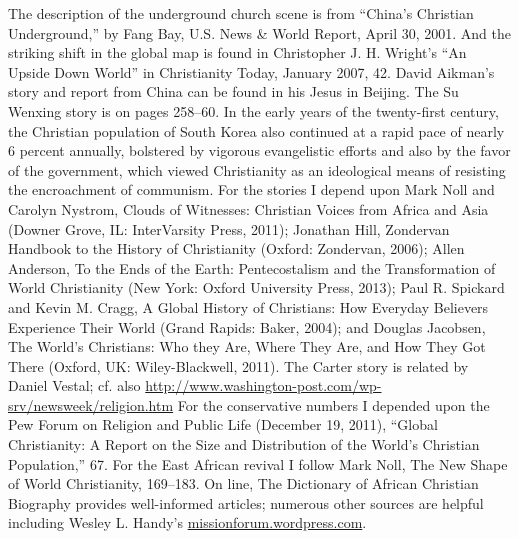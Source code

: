 \begin{notelist}
\entry The description of the underground church scene is from “China’s Christian Underground,” by
  Fang Bay, U.S. News \& World Report, April 30, 2001. And the striking shift in the global map is
  found in Christopher J. H. Wright’s “An Upside Down World” in Christianity Today, January 2007,
  42.
\entry David Aikman’s story and report from China can be found in his Jesus in Beijing. The Su
  Wenxing story is on pages 258–60.
\entry In the early years of the twenty-first century, the Christian population of South Korea also
  continued at a rapid pace of nearly 6 percent annually, bolstered by vigorous evangelistic efforts
  and also by the favor of the government, which viewed Christianity as an ideological means of
  resisting the encroachment of communism.
\entry For the stories I depend upon Mark Noll and Carolyn Nystrom, Clouds of Witnesses: Christian
  Voices from Africa and Asia (Downer Grove, IL: InterVarsity Press, 2011); Jonathan Hill, Zondervan
  Handbook to the History of Christianity (Oxford: Zondervan, 2006); Allen Anderson, To the Ends of
  the Earth: Pentecostalism and the Transformation of World Christianity (New York: Oxford
  University Press, 2013); Paul R. Spickard and Kevin M. Cragg, A Global History of Christians: How
  Everyday Believers Experience Their World (Grand Rapids: Baker, 2004); and Douglas Jacobsen, The
  World’s Christians: Who they Are, Where They Are, and How They Got There (Oxford, UK:
  Wiley-Blackwell, 2011).
\entry The Carter story is related by Daniel Vestal; cf. also
  \url{http://www.washington-post.com/wp-srv/newsweek/religion.htm}
\entry For the conservative numbers I depended upon the Pew Forum on Religion and Public Life
  (December 19, 2011), “Global Christianity: A Report on the Size and Distribution of the World’s
  Christian Population,” 67.
\entry For the East African revival I follow Mark Noll, The New Shape of World Christianity,
  169–183.
\entry On line, The Dictionary of African Christian Biography provides well-informed articles;
  numerous other sources are helpful including Wesley L. Handy’s \url{missionforum.wordpress.com}.
\end{notelist}

